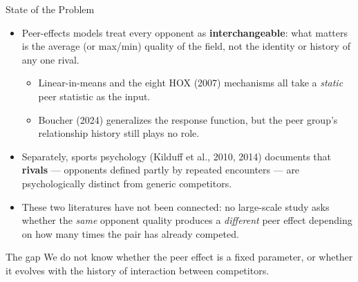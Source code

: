 \documentclass[11pt,aspectratio=169]{beamer}
\begin{document}
\begin{frame}{State of the Problem}
\small
\begin{itemize}
    \item Peer-effects models treat every opponent as
          \textbf{interchangeable}: what matters is the average (or max/min)
          quality of the field, not the identity or history of any one rival.
    \begin{itemize}
        \item Linear-in-means and the eight HOX (2007) mechanisms all take a
              \emph{static} peer statistic as the input.
        \item Boucher (2024) generalizes the response function, but the
              peer group's relationship history still plays no role.
    \end{itemize}
    \item Separately, sports psychology (Kilduff et al., 2010, 2014)
          documents that \textbf{rivals} --- opponents defined partly by
          repeated encounters --- are psychologically distinct from
          generic competitors.
    \item These two literatures have not been connected: no large-scale
          study asks whether the \emph{same} opponent quality produces a
          \emph{different} peer effect depending on how many times the pair
          has already competed.
\end{itemize}
\vspace{0.3em}
\begin{alertblock}{The gap}
We do not know whether the peer effect is a fixed parameter, or whether it
evolves with the history of interaction between competitors.
\end{alertblock}
\end{frame}
\end{document}
